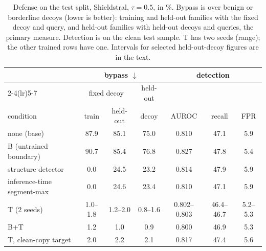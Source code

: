 \begin{table}[t]
  \centering
  \footnotesize
  \caption{Defense on the test split, Shieldstral, $\tau=0.5$, in \%. Bypass is over benign or borderline decoys (lower is better): training and held-out families with the fixed decoy and query, and held-out families with held-out decoys and queries, the primary measure. Detection is on the clean test sample. T has two seeds (range); the other trained rows have one. Intervals for selected held-out-decoy figures are in the text.}
  \label{tab:fix-main}
  \setlength{\tabcolsep}{4pt}
  \begin{tabular}{l ccc ccc}
    \toprule
    & \multicolumn{3}{c}{bypass $\downarrow$} & \multicolumn{3}{c}{detection} \\
    \cmidrule(lr){2-4}\cmidrule(lr){5-7}
    & \multicolumn{2}{c}{fixed decoy} & held-out & & & \\
    condition & train & held-out & decoy & AUROC & recall & FPR \\
    \midrule
    none (base)                & 87.9 & 85.1 & 75.0 & 0.810 & 47.1 & 5.9 \\
    B (untrained boundary)     & 90.7 & 85.4 & 76.8 & 0.827 & 47.8 & 5.4 \\
    structure detector         & 0.0 & 24.5 & 23.2 & 0.814 & 47.9 & 5.9 \\
    inference-time segment-max & 0.0 & 24.6 & 23.4 & 0.810 & 47.1 & 5.9 \\
    T (2 seeds)                & 1.0--1.8 & 1.2--2.0 & 0.8--1.6 & 0.802--0.803 & 46.4--46.7 & 5.2--5.3 \\
    B$+$T                      & 1.2 & 1.0 & 0.9 & 0.800 & 46.9 & 5.3 \\
    T, clean-copy target       & 2.0 & 2.2 & 2.1 & 0.817 & 47.4 & 5.6 \\
    \bottomrule
  \end{tabular}
\end{table}


